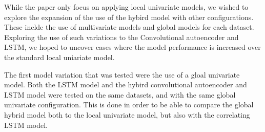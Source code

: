 




While the paper \cite{Zhao2019} only focus on applying local univariate models,
we wished to explore the expansion of the use of the hybird model with other configurations.
These inclde the use of multivariate models and global models for each dataset.
Exploring the use of such variations to the Convolutional autoencoder and LSTM,
we hoped to uncover cases where the model performance is increased over the standard local uniariate model.

The first model variation that was tested were the use of a gloal univariate model.
Both the LSTM model and the hybird convolutional autoencoder and LSTM model were tested on the same datasets,
and with the same global univariate configuration.
This is done in order to be able to compare the global hybrid model both to the local univariate model,
but also with the correlating LSTM model.
















